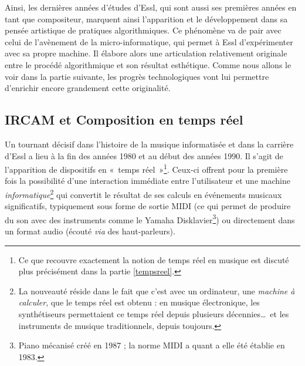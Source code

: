 \documentclass[a4paper,12pt]{article}
\newcommand{\guill}[1]{«~#1~»}
\begin{document}
Ainsi, les dernières années d'études d'Essl, qui sont aussi ses premières années en tant que compositeur, marquent ainsi l'apparition et le développement dans sa pensée artistique de pratiques algorithmiques. Ce phénomène va de pair avec celui de l'avènement de la micro-informatique, qui permet à Essl d'expérimenter avec sa propre machine. Il élabore alors une articulation relativement originale entre le procédé algorithmique et son résultat esthétique. Comme nous allons le voir dans la partie suivante, les progrès technologiques vont lui permettre d'enrichir encore grandement cette originalité.

\subsection{IRCAM et Composition en temps réel}
\label{ircam}

Un tournant décisif dans l'histoire de la musique informatisée et dans la carrière d'Essl a lieu à la fin des années 1980 et au début des années 1990. Il s'agit de l'apparition de dispositifs en \guill{temps réel}\footnote{Ce que recouvre exactement la notion de temps réel en musique est discuté plus précisément dans la partie \ref{tempsreel}.}. Ceux-ci offrent pour la première fois la possibilité d'une interaction immédiate entre l'utilisateur et une machine \emph{informatique}\footnote{La nouveauté réside dans le fait que c'est avec un ordinateur, une \emph{machine à calculer}, que le temps réel est obtenu : en musique électronique, les synthétiseurs permettaient ce temps réel depuis plusieurs décennies\dots~et les instruments de musique traditionnels, depuis toujours.} qui convertit le résultat de ses calculs en événements musicaux significatifs, typiquement sous forme de sortie MIDI (ce qui permet de produire du son avec des instruments comme le Yamaha Disklavier\footnote{Piano mécanisé créé en 1987 ; la norme MIDI a quant a elle été établie en 1983.}) ou directement dans un format audio (écouté \emph{via} des haut-parleurs).
\end{document}
